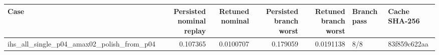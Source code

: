 \begin{tabular}{lrrrrll}
\toprule
Case & Persisted nominal replay & Retuned nominal & Persisted branch worst & Retuned branch worst & Branch pass & Cache SHA-256 \\
\midrule
ihs\_all\_single\_p04\_amax02\_polish\_from\_p04 & 0.107365 & 0.0100707 & 0.179059 & 0.0191138 & 8/8 & 83f859c622aa \\
\bottomrule
\end{tabular}
